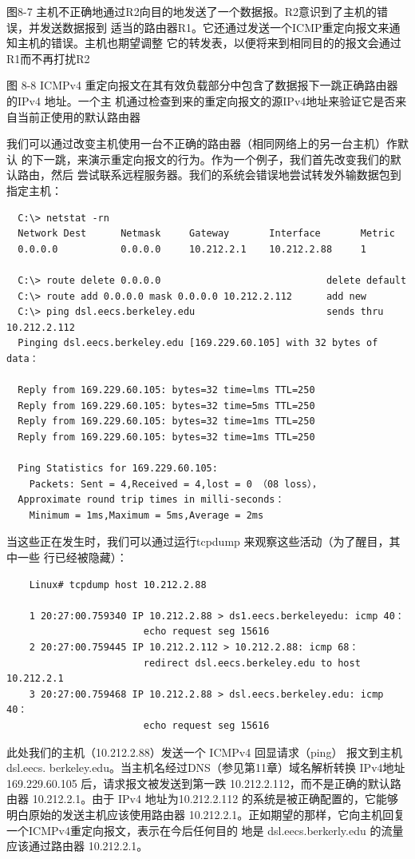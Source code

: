 图8-7 主机不正确地通过R2向目的地发送了一个数据报。R2意识到了主机的错误，并发送数据报到
适当的路由器R1。它还通过发送一个ICMP重定向报文来通知主机的错误。主机也期望调整
它的转发表，以便将来到相同目的的报文会通过R1而不再打扰R2

图 8-8 ICMPv4 重定向报文在其有效负载部分中包含了数据报下一跳正确路由器的IPv4 地址。一个主
机通过检查到来的重定向报文的源IPv4地址来验证它是否来自当前正使用的默认路由器

我们可以通过改变主机使用一台不正确的路由器（相同网络上的另一台主机）作默认
的下一跳，来演示重定向报文的行为。作为一个例子，我们首先改变我们的默认路由，然后
尝试联系远程服务器。我们的系统会错误地尝试转发外输数据包到指定主机：

\begin{verbatim}
  C:\> netstat -rn
  Network Dest      Netmask     Gateway       Interface       Metric
  0.0.0.0           0.0.0.0     10.212.2.1    10.212.2.88     1

  C:\> route delete 0.0.0.0                             delete default
  C:\> route add 0.0.0.0 mask 0.0.0.0 10.212.2.112      add new
  C:\> ping dsl.eecs.berkeley.edu                       sends thru 10.212.2.112
  Pinging dsl.eecs.berkeley.edu [169.229.60.105] with 32 bytes of data：

  Reply from 169.229.60.105: bytes=32 time=lms TTL=250
  Reply from 169.229.60.105: bytes=32 time=5ms TTL=250
  Reply from 169.229.60.105: bytes=32 time=1ms TTL=250
  Reply from 169.229.60.105: bytes=32 time=1ms TTL=250

  Ping Statistics for 169.229.60.105:
    Packets: Sent = 4,Received = 4,lost = 0 （08 loss），
  Approximate round trip times in milli-seconds：
    Minimum = 1ms,Maximum = 5ms,Average = 2ms
\end{verbatim}

当这些正在发生时，我们可以通过运行tcpdump 来观察这些活动（为了醒目，其中一些
行已经被隐藏）：

\begin{verbatim}
	Linux# tcpdump host 10.212.2.88

	1 20:27:00.759340 IP 10.212.2.88 > ds1.eecs.berkeleyedu: icmp 40：
						echo request seg 15616
	2 20:27:00.759445 IP 10.212.2.112 > 10.212.2.88: icmp 68：
						redirect dsl.eecs.berkeley.edu to host 10.212.2.1
	3 20:27:00.759468 IP 10.212.2.88 > dsl.eecs.berkeley.edu: icmp 40：
						echo request seg 15616
\end{verbatim}

此处我们的主机（10.212.2.88）发送一个 ICMPv4 回显请求（ping） 报文到主机 dsl.eecs.
berkeley.edu。当主机名经过DNS（参见第11章）域名解析转换 IPv4地址169.229.60.105
后，请求报文被发送到第一跌 10.212.2.112，而不是正确的默认路由器 10.212.2.1。由于 IPv4
地址为10.212.2.112 的系统是被正确配置的，它能够明白原始的发送主机应该使用路由器
10.212.2.1。正如期望的那样，它向主机回复一个ICMPv4重定向报文，表示在今后任何目的
地是 dsl.eecs.berkerly.edu 的流量应该通过路由器 10.212.2.1。

